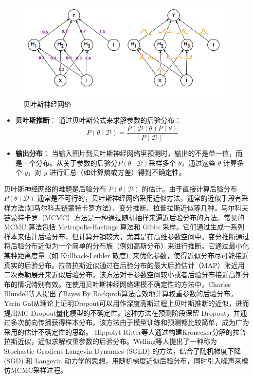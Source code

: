 \begin{figure}[H]
    \centering
    \includegraphics[width=0.75\linewidth]{assets/2-1.png}
    \caption{贝叶斯神经网络\cite{blundell2015weight}
}
    \label{fig:bnn}
\end{figure}


\begin{itemize}
    \item \textbf{贝叶斯推断}：
    通过贝叶斯公式来求解参数的后验分布：
    \[
    P(\theta \mid \mathcal{D}) = \frac{P(\mathcal{D} \mid \theta) P(\theta)}{P(\mathcal{D})}
    \]

    
    \item \textbf{输出分布}：
    当输入图片到贝叶斯神经网络里预测时，输出的不是单一值，而是一个分布。从关于参数的后验分\( P(\theta \mid \mathcal{D}) \)采样多个 \( \theta \)，通过这些 \( \theta \) 计算多个 \( y \)，对 \( y \) 进行汇总（如计算熵或方差）得到不确定性。
\end{itemize}

贝叶斯神经网络的难题是后验分布 \( P(\theta \mid \mathcal{D}) \) 的估计。由于直接计算后验分布 \( P(\theta \mid \mathcal{D}) \) 通常是不可行的，贝叶斯神经网络采用近似方法，通常的近似手段有采样方法(如马尔科夫链蒙特卡罗方法）、变分推断、拉普拉斯近似等几种。马尔科夫链蒙特卡罗（MCMC）方法是一种通过随机抽样来逼近后验分布的方法。常见的 MCMC 算法包括 Metropolis-Hastings 算法和 Gibbs 采样。它们通过生成一系列样本来估计后验分布，但计算开销较大，尤其是在高维参数空间中。变分推断通过将后验分布近似为一个简单的分布族（例如高斯分布）来进行推断。它通过最小化某种距离度量（如 Kullback-Leibler 散度）来优化参数，使得近似分布尽可能接近真实的后验分布。拉普拉斯近似通过在后验分布的最大后验估计（MAP）附近用二次泰勒展开来近似后验分布。该方法对于参数空间较小或者后验分布接近高斯分布的情况特别有效。在使用贝叶斯神经网络建模不确定性的方法中，Charles Blundell\cite{blundell2015weight}等人提出了Bayes By Backprob算法高效地计算权重参数的后验分布。Yarin Gal\cite{gal2016dropout}从理论上证明Dropout可以用作深度高斯过程上贝叶斯推断的近似，进而提出MC Dropout量化模型的不确定性。这种方法在预测阶段保留 Dropout，并通过多次前向传播获得样本分布，该方法由于模型训练和预测都比较简单，成为广为采用的估计不确定性的思路。 Hippolyt Ritter\cite{ritter2018scalable}等人通过构建Kronecker分解的拉普拉斯近似，近似求解权重参数的后验分布。Welling等人\cite{welling2011bayesian}提出了一种称为 Stochastic Gradient Langevin Dynamics (SGLD) 的方法，结合了随机梯度下降 (SGD) 和 Langevin 动力学的思想，用随机梯度近似后验分布，同时引入噪声来模仿MCMC采样过程。




